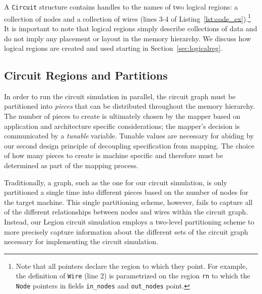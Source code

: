 A {\tt Circuit} structure contains handles to the
names of two logical regions: a collection of nodes 
and a collection of wires (lines 3-4 of 
Listing~\ref{lst:code_ex}).\footnote{Note that all 
pointers declare the region to which they point.  For
example, the definition of {\tt Wire} (line 2) is 
parametrized on the region {\tt rn} to which the 
{\tt Node} pointers in fields {\tt in\_nodes}
and {\tt out\_nodes} point.} It is important to note
that logical regions simply describe collections of data
and do not imply any placement or layout in the
memory hierarchy. We discuss how logical regions are
created and used starting in Section~\ref{sec:logicalreg}.

\subsection{Circuit Regions and Partitions}
\label{subsec:circuitregpart}
In order to run the circuit simulation in parallel, 
the circuit graph must be partitioned into {\em pieces}
that can be distributed throughout the memory hierarchy.
The number of pieces to create is ultimately chosen
by the mapper based on application and architecture
specific considerations; the mapper's decision is
communicated by a {\em tunable} variable\cite{Sequoia06}.
Tunable values are necessary for abiding by our second 
design principle of decoupling specification from mapping.
The choice of how many pieces to create is machine specific
and therefore must be determined as part of the mapping
process.

Traditionally, a graph, such as the one for our circuit
simulation, is only partitioned a single time into 
different pieces based on the number of nodes
for the target machine. This single partitioning scheme,
however, fails to capture all of the different relationships
between nodes and wires within the circuit graph. Instead,
our Legion circuit simulation employs a two-level
partitioning scheme to more precisely capture information
about the different sets of the circuit graph necessary
for implementing the circuit simulation.

